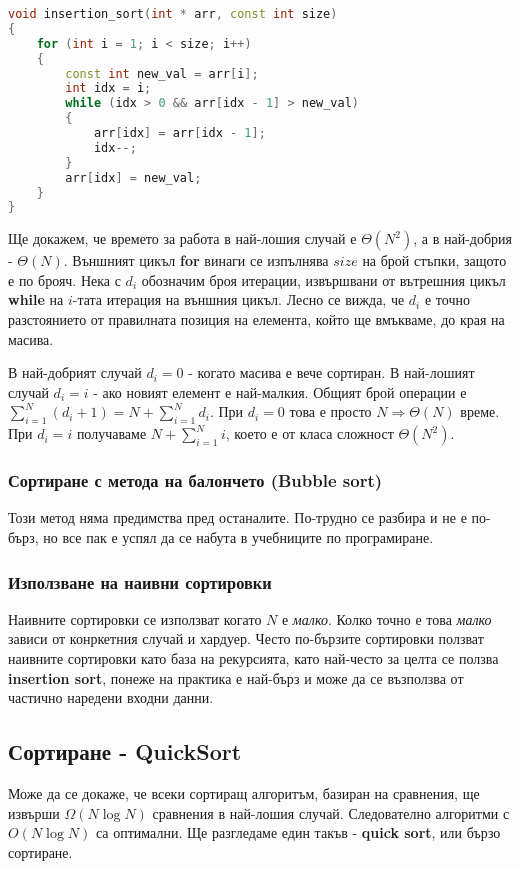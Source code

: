 \documentclass[fleqn,12pt]{article}
\begin{document}
\begin{lstlisting}[language=C++, caption=Insertion sort]
void insertion_sort(int * arr, const int size)
{
    for (int i = 1; i < size; i++)
    {
        const int new_val = arr[i];
        int idx = i;
        while (idx > 0 && arr[idx - 1] > new_val)
        {
            arr[idx] = arr[idx - 1];
            idx--; 
        }
        arr[idx] = new_val;
    }
}
\end{lstlisting}

Ще докажем, че времето за работа в най-лошия случай е $\Theta(N^2)$, а в най-добрия - $\Theta(N)$.
Външният цикъл \textbf{for} винаги се изпълнява $size$ на брой стъпки, защото е по брояч.
Нека с $d_i$ обозначим броя итерации, извършвани от вътрешния цикъл \textbf{while} на $i$-тата итерация на външния цикъл.
Лесно се вижда, че $d_i$ е точно разстоянието от правилната позиция на елемента, който ще вмъкваме, до края на масива.

В най-добрият случай $d_i = 0$ - когато масива е вече сортиран. В най-лошият случай $d_i = i$ - ако новият елемент е най-малкия.
Общият брой операции е $\sum_{i = 1}^{N} (d_i + 1) = N + \sum_{i = 1}^{N} d_i$.
При $d_i = 0$ това е просто $N \Rightarrow \Theta(N)$ време. При $d_i = i$ 
получаваме $N + \sum_{i = 1}^N i$, което е от класа сложност $\Theta(N^2)$.

\subsubsection{Сортиране с метода на балончето (Bubble sort)}
Този метод няма предимства пред останалите. По-трудно се разбира и не е по-бърз, но все пак е успял 
да се набута в учебниците по програмиране.

\subsubsection{Използване на наивни сортировки}
Наивните сортировки се използват когато $N$ е \textit{малко}. Колко точно е това \textit{малко} зависи от конркетния случай и хардуер.
Често по-бързите сортировки ползват наивните сортировки като база на рекурсията, като най-често за целта се ползва \textbf{insertion sort}, 
понеже на практика е най-бърз и може да се възползва от частично наредени входни данни.

\subsection{Сортиране - QuickSort}
Може да се докаже, че всеки сортиращ алгоритъм, базиран на сравнения, ще извърши $\Omega(N \log N)$ сравнения в най-лошия случай.
Следователно алгоритми с $O(N \log N)$ са оптимални. Ще разгледаме един такъв - \textbf{quick sort}, или бързо сортиране.
\end{document}

